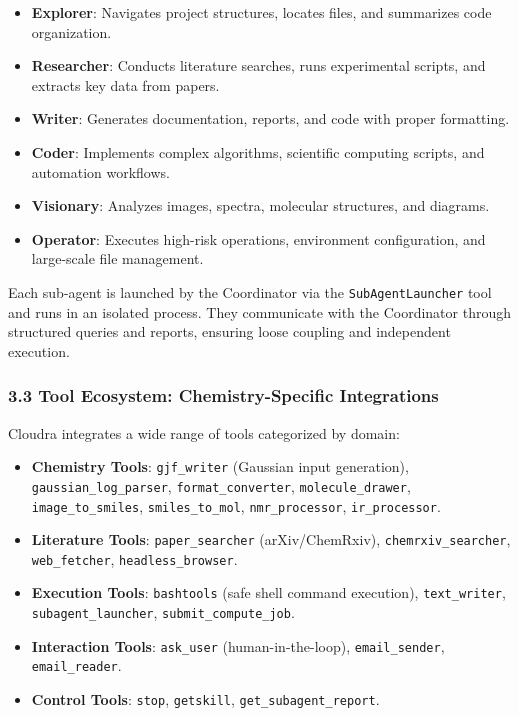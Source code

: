 \begin{itemize}
\tightlist
\item
  \textbf{Explorer}: Navigates project structures, locates files, and
  summarizes code organization.
\item
  \textbf{Researcher}: Conducts literature searches, runs experimental
  scripts, and extracts key data from papers.
\item
  \textbf{Writer}: Generates documentation, reports, and code with
  proper formatting.
\item
  \textbf{Coder}: Implements complex algorithms, scientific computing
  scripts, and automation workflows.
\item
  \textbf{Visionary}: Analyzes images, spectra, molecular structures,
  and diagrams.
\item
  \textbf{Operator}: Executes high-risk operations, environment
  configuration, and large-scale file management.
\end{itemize}

Each sub-agent is launched by the Coordinator via the
\texttt{SubAgentLauncher} tool and runs in an isolated process. They
communicate with the Coordinator through structured queries and reports,
ensuring loose coupling and independent execution.

\hypertarget{tool-ecosystem-chemistry-specific-integrations}{%
\subsubsection{3.3 Tool Ecosystem: Chemistry-Specific
Integrations}\label{tool-ecosystem-chemistry-specific-integrations}}

Cloudra integrates a wide range of tools categorized by domain:

\begin{itemize}
\tightlist
\item
  \textbf{Chemistry Tools}: \texttt{gjf\_writer} (Gaussian input
  generation), \texttt{gaussian\_log\_parser},
  \texttt{format\_converter}, \texttt{molecule\_drawer},
  \texttt{image\_to\_smiles}, \texttt{smiles\_to\_mol},
  \texttt{nmr\_processor}, \texttt{ir\_processor}.
\item
  \textbf{Literature Tools}: \texttt{paper\_searcher} (arXiv/ChemRxiv),
  \texttt{chemrxiv\_searcher}, \texttt{web\_fetcher},
  \texttt{headless\_browser}.
\item
  \textbf{Execution Tools}: \texttt{bashtools} (safe shell command
  execution), \texttt{text\_writer}, \texttt{subagent\_launcher},
  \texttt{submit\_compute\_job}.
\item
  \textbf{Interaction Tools}: \texttt{ask\_user} (human-in-the-loop),
  \texttt{email\_sender}, \texttt{email\_reader}.
\item
  \textbf{Control Tools}: \texttt{stop}, \texttt{getskill},
  \texttt{get\_subagent\_report}.
\end{itemize}

